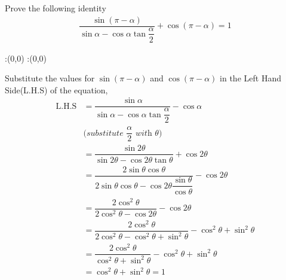 

\question[4] Prove the following identity
\begin{align}
  \dfrac{\sin(\pi - \alpha)}{\sin\alpha - 
  	\cos\alpha\tan\dfrac{\alpha}{2}}
  	+ \cos(\pi - \alpha) = 1 \nonumber
\end{align}


\ifprintanswers
  \begin{marginfigure}
      :(0,0)
      :(0,0)
    \figdrawbegin{}
      \figdrawline [100,101]
    \figdrawend
    \figvisu{\figBoxA}{}{%
    }
    \centerline{\box\figBoxA}
  \end{marginfigure}
\fi 

\begin{solution}[\halfpage]
  Substitute the values for $\sin(\pi - \alpha)$ and $\cos(\pi - \alpha)$ 
  in the Left Hand Side(L.H.S) of the equation,
  \begin{align}
    \text{L.H.S} &= \dfrac{\sin\alpha}{\sin\alpha -
    				  \cos\alpha\tan\dfrac{\alpha}{2}}
					  - \cos\alpha \\
    &\textit{(substitute $\dfrac{\alpha}{2}$ with $\theta$)} \nonumber \\
				 &= \dfrac{\sin 2\theta}{\sin 2\theta - 
				 	  \cos 2\theta\tan\theta} + \cos 2\theta \\	
				 &= \dfrac{2\sin\theta\cos\theta}{2\sin\theta\cos\theta - 
				 	  \cos 2\theta\dfrac{\sin\theta}{\cos\theta}} 
				 	  - \cos 2\theta \\
				 &= \dfrac{2\cos ^2\theta}{2\cos^2\theta - 
				 	  \cos 2\theta} - \cos 2\theta \\
				 &= \dfrac{2\cos ^2\theta}{2\cos^2\theta - 
				 	  \cos^2\theta + \sin^2\theta} - \cos^2\theta + \sin^2\theta \\
				 &= \dfrac{2\cos^2\theta}{\cos^2\theta + \sin^2\theta} -
				 	  \cos^2\theta + \sin^2\theta \\
				 &= \cos^2\theta + \sin^2\theta = 1
  \end{align}
\end{solution}
